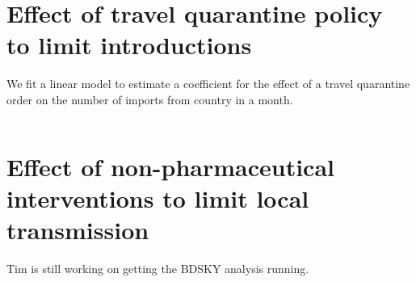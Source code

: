 \documentclass[9pt,twocolumn,twoside,lineno]{pnas-new}
\begin{document}




\section*{Effect of travel quarantine policy to limit introductions}

We fit a linear model to estimate a coefficient for the effect of a travel quarantine order on the number of imports from country in a month.

\begin{equation}
    
\end{equation}

\section*{Effect of non-pharmaceutical interventions to limit local transmission}

Tim is still working on getting the BDSKY analysis running.



\end{document}
